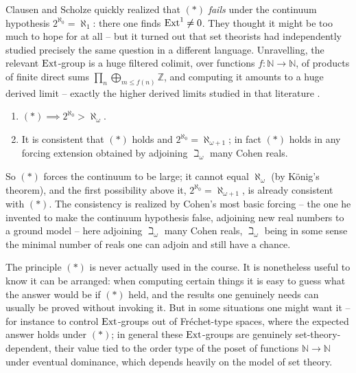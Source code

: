 \begin{remark}
\label{rmk:4:star-CH}
Clausen and Scholze quickly realized that $(\ast)$ \emph{fails} under the
continuum hypothesis $2^{\aleph_0}=\aleph_1$: there one finds
$\operatorname{Ext}^{1}\neq0$. They thought it might be too much to hope for at all -- but it
turned out that set theorists had independently studied precisely the same
question in a different language. Unravelling, the relevant $\operatorname{Ext}$-group is a
huge filtered colimit, over functions $f\colon\mathbb{N}\to\mathbb{N}$, of
products of finite direct sums $\prod_{n}\bigoplus_{m\leq f(n)}\mathbb{Z}$, and
computing it amounts to a huge derived limit -- exactly the higher derived
limits studied in that literature
\cite{bergfalk2021simultaneouslyvanishinghigherderived,bergfalk2021simutaneouslyvanishinghigherderived}.
\end{remark}

\begin{theorem}
\label{thm:4:star-set-theory}
\leavevmode
\begin{enumerate}
\item $(\ast)\implies 2^{\aleph_0}>\aleph_{\omega}$.
\item It is consistent that $(\ast)$ holds and
$2^{\aleph_0}=\aleph_{\omega+1}$; in fact $(\ast)$ holds in any forcing extension
obtained by adjoining $\beth_{\omega}$ many Cohen reals.
\end{enumerate}
\end{theorem}

So $(\ast)$ forces the continuum to be large; it cannot equal $\aleph_{\omega}$
(by K\"onig's theorem), and the first possibility above it,
$2^{\aleph_0}=\aleph_{\omega+1}$, is already consistent with $(\ast)$. The
consistency is realized by Cohen's most basic forcing -- the one he invented to
make the continuum hypothesis false, adjoining new real numbers to a ground model
-- here adjoining $\beth_{\omega}$ many Cohen reals, $\beth_{\omega}$ being in
some sense the minimal number of reals one can adjoin and still have a
chance.

\begin{remark}
\label{rmk:4:star-usage}
The principle $(\ast)$ is never actually used in the course. It is nonetheless
useful to know it can be arranged: when computing certain things it is easy to
guess what the answer would be if $(\ast)$ held, and the results one genuinely
needs can usually be proved without invoking it. But in some situations one might
want it -- for instance to control $\operatorname{Ext}$-groups out of Fr\'echet-type spaces,
where the expected answer holds under $(\ast)$; in general these $\operatorname{Ext}$-groups
are genuinely set-theory-dependent, their value tied to the order type of the
poset of functions $\mathbb{N}\to\mathbb{N}$ under eventual dominance, which
depends heavily on the model of set theory.
\end{remark}
